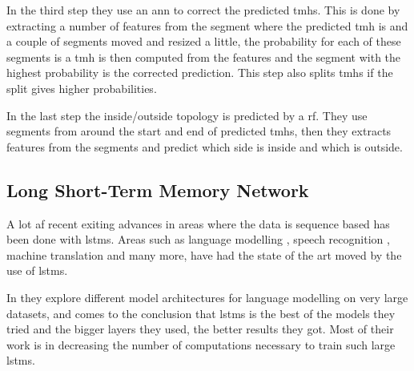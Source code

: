 In the third step they use an \gls{ann} to correct the predicted \glspl{tmh}. This is done by extracting a 
number of features from the segment where the predicted \gls{tmh} is and a couple of segments moved and 
resized a little, the probability for each of these segments is a \gls{tmh} is then computed from the features
and the segment with the highest probability is the corrected prediction. This step also splits 
\glspl{tmh} if the split gives higher probabilities. 

In the last step the inside/outside topology is predicted by a \gls{rf}. They use segments from around 
the start and end of predicted \glspl{tmh}, then they extracts features from the segments and predict which 
side is inside and which is outside.

\subsection{Long Short-Term Memory Network}

A lot af recent exiting advances in areas where the data is sequence based 
has been done with \glspl{lstm}. Areas such as language modelling \cite{JozefowiczEtAl, ShazeerEtAl},
speech recognition \cite{XiongEtAl}, machine translation \cite{WuEtAl} and many more, have had the 
state of the art moved by the use of \glspl{lstm}. 


In \cite{JozefowiczEtAl} they explore different model architectures for language modelling 
on very large datasets, and comes to the conclusion that \glspl{lstm} is the best of the models
they tried and the bigger layers they used, the better results they got. Most of their work is
in decreasing the number of computations necessary to train such large \glspl{lstm}. 
 
 